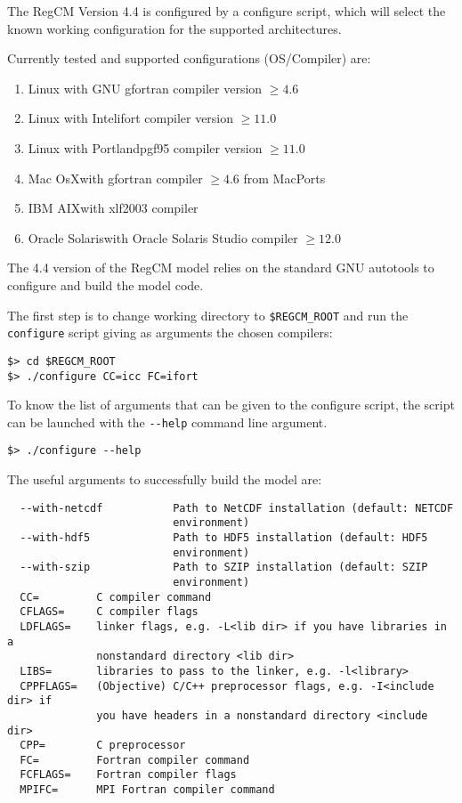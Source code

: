 The RegCM Version 4.4 is configured by a configure script, which will select
the known working configuration for the supported architectures.

Currently tested and supported configurations (OS/Compiler) are:

\begin{enumerate}
\item Linux with GNU gfortran compiler version $\ge 4.6$
\item Linux with Intel\texttrademark ifort compiler version $\ge 11.0$
\item Linux with Portland\texttrademark pgf95 compiler version $\ge 11.0$
\item Mac OsX\texttrademark with gfortran compiler $\ge 4.6$ from MacPorts
\item IBM AIX\texttrademark with xlf2003 compiler
\item Oracle Solaris\texttrademark with Oracle Solaris Studio\texttrademark
compiler $\ge 12.0$
\end{enumerate}

The 4.4 version of the RegCM model relies on the standard GNU autotools to
configure and build the model code.

The first step is to change working directory to \verb=$REGCM_ROOT= and run the
\verb=configure= script giving as arguments the chosen compilers:

\begin{Verbatim}
$> cd $REGCM_ROOT
$> ./configure CC=icc FC=ifort
\end{Verbatim}

To know the list of arguments that can be given to the configure script, the
script can be launched with the \verb=--help= command line argument.

\begin{Verbatim}
$> ./configure --help
\end{Verbatim}

The useful arguments to successfully build the model are:

\begin{Verbatim}
  --with-netcdf           Path to NetCDF installation (default: NETCDF
                          environment)
  --with-hdf5             Path to HDF5 installation (default: HDF5
                          environment)
  --with-szip             Path to SZIP installation (default: SZIP
                          environment)
  CC=         C compiler command
  CFLAGS=     C compiler flags
  LDFLAGS=    linker flags, e.g. -L<lib dir> if you have libraries in a
              nonstandard directory <lib dir>
  LIBS=       libraries to pass to the linker, e.g. -l<library>
  CPPFLAGS=   (Objective) C/C++ preprocessor flags, e.g. -I<include dir> if
              you have headers in a nonstandard directory <include dir>
  CPP=        C preprocessor
  FC=         Fortran compiler command
  FCFLAGS=    Fortran compiler flags
  MPIFC=      MPI Fortran compiler command
\end{Verbatim}

